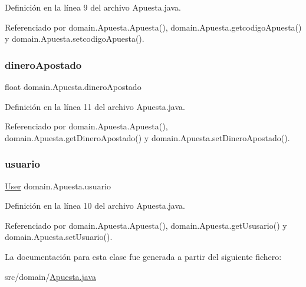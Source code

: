 Definición en la línea 9 del archivo Apuesta.\+java.



Referenciado por domain.\+Apuesta.\+Apuesta(), domain.\+Apuesta.\+getcodigo\+Apuesta() y domain.\+Apuesta.\+setcodigo\+Apuesta().

\mbox{\label{classdomain_1_1Apuesta_abad5a9f03d069677bfdcd8505fc9babb}} 
\subsubsection{\texorpdfstring{dineroApostado}{dineroApostado}}
{\footnotesize\ttfamily float domain.\+Apuesta.\+dinero\+Apostado\hspace{0.3cm}{\ttfamily [private]}}



Definición en la línea 11 del archivo Apuesta.\+java.



Referenciado por domain.\+Apuesta.\+Apuesta(), domain.\+Apuesta.\+get\+Dinero\+Apostado() y domain.\+Apuesta.\+set\+Dinero\+Apostado().

\mbox{\label{classdomain_1_1Apuesta_a0d23f0bdf469bdfe1731964cf451feef}} 
\subsubsection{\texorpdfstring{usuario}{usuario}}
{\footnotesize\ttfamily \mbox{\hyperlink{classdomain_1_1User}{User}} domain.\+Apuesta.\+usuario\hspace{0.3cm}{\ttfamily [private]}}



Definición en la línea 10 del archivo Apuesta.\+java.



Referenciado por domain.\+Apuesta.\+Apuesta(), domain.\+Apuesta.\+get\+Ususario() y domain.\+Apuesta.\+set\+Usuario().



La documentación para esta clase fue generada a partir del siguiente fichero\+:\begin{DoxyCompactItemize}
\item 
src/domain/\mbox{\hyperlink{Apuesta_8java}{Apuesta.\+java}}\end{DoxyCompactItemize}
